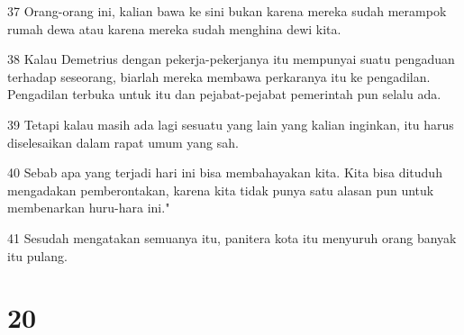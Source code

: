 \par 37 Orang-orang ini, kalian bawa ke sini bukan karena mereka sudah merampok rumah dewa atau karena mereka sudah menghina dewi kita.
\par 38 Kalau Demetrius dengan pekerja-pekerjanya itu mempunyai suatu pengaduan terhadap seseorang, biarlah mereka membawa perkaranya itu ke pengadilan. Pengadilan terbuka untuk itu dan pejabat-pejabat pemerintah pun selalu ada.
\par 39 Tetapi kalau masih ada lagi sesuatu yang lain yang kalian inginkan, itu harus diselesaikan dalam rapat umum yang sah.
\par 40 Sebab apa yang terjadi hari ini bisa membahayakan kita. Kita bisa dituduh mengadakan pemberontakan, karena kita tidak punya satu alasan pun untuk membenarkan huru-hara ini."
\par 41 Sesudah mengatakan semuanya itu, panitera kota itu menyuruh orang banyak itu pulang.

\chapter{20}

